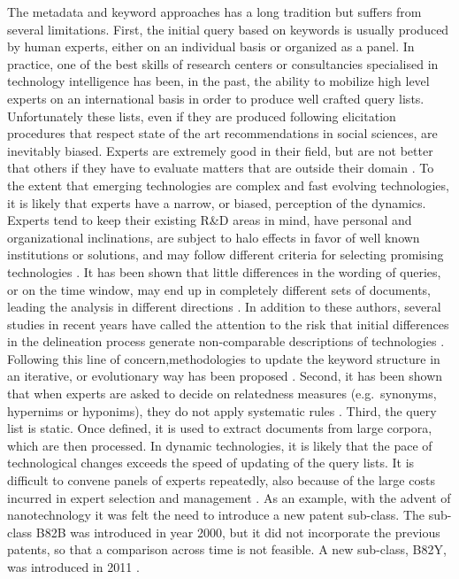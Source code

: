\documentclass[]{book}
\begin{document}
The metadata and keyword approaches has a long tradition but suffers
from several limitations. First, the initial query based on keywords is
usually produced by human experts, either on an individual basis or
organized as a panel. In practice, one of the best skills of research
centers or consultancies specialised in technology intelligence has
been, in the past, the ability to mobilize high level experts on an
international basis in order to produce well crafted query lists.
Unfortunately these lists, even if they are produced following
elicitation procedures that respect state of the art recommendations in
social sciences, are inevitably biased. Experts are extremely good in
their field, but are not better that others if they have to evaluate
matters that are outside their domain \citep{burgman2015trusting}. To
the extent that emerging technologies are complex and fast evolving
technologies, it is likely that experts have a narrow, or biased,
perception of the dynamics. Experts tend to keep their existing R\&D
areas in mind, have personal and organizational inclinations, are
subject to halo effects in favor of well known institutions or
solutions, and may follow different criteria for selecting promising
technologies \citep{kim2017novel}. It has been shown that little
differences in the wording of queries, or on the time window, may end up
in completely different sets of documents, leading the analysis in
different directions \citep{bassecoulard2007mapping}. In addition to
these authors, several studies in recent years have called the attention
to the risk that initial differences in the delineation process generate
non-comparable descriptions of technologies
\citep[\citet{youtie2008nanotechnology},
\citet{ghazinoory2013application}]{mogoutov2007data}. Following this
line of concern,methodologies to update the keyword structure in an
iterative, or evolutionary way has been proposed
\citep{mogoutov2007data}. Second, it has been shown that when experts
are asked to decide on relatedness measures (e.g.~synonyms, hypernims or
hyponims), they do not apply systematic rules
\citep[\citet{noh2015keyword}]{tseng2007text}. Third, the query list is
static. Once defined, it is used to extract documents from large
corpora, which are then processed. In dynamic technologies, it is likely
that the pace of technological changes exceeds the speed of updating of
the query lists. It is difficult to convene panels of experts
repeatedly, also because of the large costs incurred in expert selection
and management \citep{tseng2007text}. As an example, with the advent of
nanotechnology it was felt the need to introduce a new patent sub-class.
The sub-class B82B was introduced in year 2000, but it did not
incorporate the previous patents, so that a comparison across time is
not feasible. A new sub-class, B82Y, was introduced in 2011
\citep{kreuchauff2017patent}.
\end{document}
